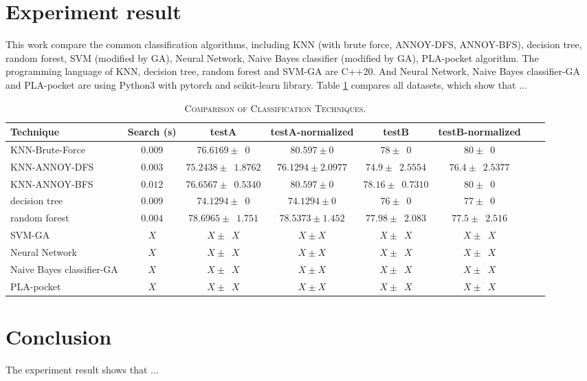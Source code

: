 \documentclass[twocolumn,10pt]{article}
\begin{document}
\section{Experiment result}
  This work compare the common classification algorithms, including KNN (with brute force, ANNOY-DFS, ANNOY-BFS), decision tree, 
  random forest, SVM (modified by GA), Neural Network, Naive Bayes classifier (modified by GA), PLA-pocket algorithm. 
  The programming language of KNN, decision tree, random forest and SVM-GA are C++20. And Neural Network, Naive Bayes classifier-GA 
  and PLA-pocket are using Python3 with pytorch and scikit-learn library. 
  Table \ref{table:overall} compares all datasets, which show that ...
  \begin{table}[htb]
    \newcommand{\z}{\phantom{0}}
    \caption{\textsc{Comparison of Classification Techniques.}}
      \vspace{-\baselineskip}
    \begin{tabular}{@{}lccccccl@{}}\toprule
    Technique & Search (s) & testA & testA-normalized & testB & testB-normalized \\ \midrule
    KNN-Brute-Force  & $0.009$ & $76.6169 \pm \z{0}$                & $80.597 \pm 0$               & $78 \pm \z{0}$                 & $80 \pm \z{0}$\\
    KNN-ANNOY-DFS    & $0.003$ & $75.2438 \pm \z{1.8762}$           & $76.1294 \pm 2.0977$         & $74.9 \pm \z{2.5554}$          & $76.4 \pm \z{2.5377}$\\
    KNN-ANNOY-BFS    & $0.012$ & $76.6567 \pm \z{0.5340}$           & $80.597 \pm 0$               & $78.16 \pm \z{0.7310}$         & $80 \pm \z{0}$\\
    decision tree    & $0.009$ & $74.1294 \pm \z{0}$                & $74.1294 \pm 0$              & $76 \pm \z{0}$                 & $77 \pm \z{0}$\\
    random forest    & $0.004$ & $78.6965 \pm \z{1.751}$            & $78.5373 \pm 1.452$          & $77.98 \pm \z{2.083}$          & $77.5 \pm \z{2.516}$\\
    SVM-GA           & $X$ & $X \pm \z{X}$                          & $X \pm X$                    & $X \pm \z{X}$                  & $X \pm \z{X}$\\
    Neural Network   & $X$ & $X \pm \z{X}$                          & $X \pm X$                    & $X \pm \z{X}$                  & $X \pm \z{X}$\\
    Naive Bayes classifier-GA    & $X$ & $X \pm \z{X}$              & $X \pm X$                    & $X \pm \z{X}$                  & $X \pm \z{X}$\\
    PLA-pocket       & $X$ & $X \pm \z{X}$                          & $X \pm X$                    & $X \pm \z{X}$                  & $X \pm \z{X}$\\ \midrule
    \end{tabular}
    \label{table:overall}
      \vspace{-\baselineskip}
  \end{table}

\section{Conclusion}
  The experiment result shows that ...


\end{document}
